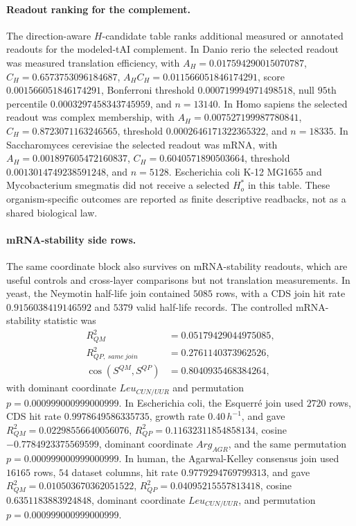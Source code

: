\paragraph{Readout ranking for the complement.}
The direction-aware $H$-candidate table ranks additional measured or annotated readouts for the modeled-tAI complement.  In Danio rerio the selected readout was measured translation efficiency, with $A_H=0.017594290015070787$, $C_H=0.6573753096184687$, $A_HC_H=0.011566051846174291$, score $0.001566051846174291$, Bonferroni threshold $0.000719994971498518$, null $95$th percentile $0.0003297458343745959$, and $n=13140$.  In Homo sapiens the selected readout was complex membership, with $A_H=0.007527199987780841$, $C_H=0.8723071163246565$, threshold $0.0002646171322365322$, and $n=18335$.  In Saccharomyces cerevisiae the selected readout was mRNA, with $A_H=0.001897605472160837$, $C_H=0.6040571890503664$, threshold $0.0013014749238591248$, and $n=5128$.  Escherichia coli K-12 MG1655 and Mycobacterium smegmatis did not receive a selected $H_o^{\ast}$ in this table.  These organism-specific outcomes are reported as finite descriptive readbacks, not as a shared biological law.

\paragraph{mRNA-stability side rows.}
The same coordinate block also survives on mRNA-stability readouts, which are useful controls and cross-layer comparisons but not translation measurements.  In yeast, the Neymotin half-life join contained $5085$ rows, with a CDS join hit rate $0.9156038419146592$ and $5379$ valid half-life records.  The controlled mRNA-stability statistic was
$$
\begin{aligned}
R^2_{QM} &= 0.05179429044975085,\\
R^2_{QP,\ same\ join} &= 0.2761140373962526,\\
\cos(S^{QM},S^{QP}) &= 0.8040935468384264,
\end{aligned}
$$
with dominant coordinate $Leu_{CUN/UUR}$ and permutation $p=0.000999000999000999$.  In Escherichia coli, the Esquerr\'e join used $2720$ rows, CDS hit rate $0.9978649586335735$, growth rate $0.40\,h^{-1}$, and gave $R^2_{QM}=0.02298556640056076$, $R^2_{QP}=0.11632311854858134$, cosine $-0.7784923375569599$, dominant coordinate $Arg_{AGR}$, and the same permutation $p=0.000999000999000999$.  In human, the Agarwal-Kelley consensus join used $16165$ rows, $54$ dataset columns, hit rate $0.9779294769799313$, and gave $R^2_{QM}=0.010503670362051522$, $R^2_{QP}=0.04095215557813418$, cosine $0.6351183883924848$, dominant coordinate $Leu_{CUN/UUR}$, and permutation $p=0.000999000999000999$.

